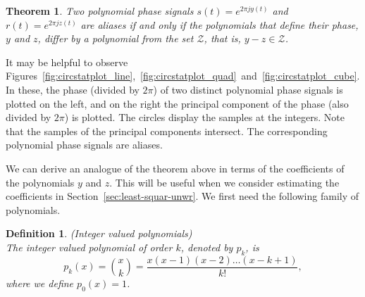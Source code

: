 \documentclass[aap]{imsart}
\newtheorem{corollary}{Corollary}
\newtheorem{theorem}{Theorem}
\newtheorem{definition}{Definition}
\begin{document}
\begin{theorem}\label{thm:circpolysampledthm}
Two polynomial phase signals $s(t) = e^{2\pi j y(t)}$  and $r(t) = e^{2\pi j z(t)}$  are aliases if and only if the polynomials that define their phase, $y$ and $z$, differ by a polynomial from the set $\mathcal{Z}$, that is, $y - z \in \mathcal{Z}$.
\end{theorem}



It may be helpful to observe Figures~\ref{fig:circstatplot_line},~\ref{fig:circstatplot_quad}~and~\ref{fig:circstatplot_cube}.  In these, the phase (divided by $2\pi$) of two distinct polynomial phase signals is plotted on the left, and on the right the principal component of the phase (also divided by $2\pi$) is plotted.  The circles display the samples at the integers. Note that the samples of the principal components intersect.  The corresponding polynomial phase signals are aliases.

We can derive an analogue of the theorem above in terms of the coefficients of the polynomials $y$ and $z$. This will be useful when we consider estimating the coefficients in Section~\ref{sec:least-squar-unwr}.  We first need the following family of polynomials. 

\begin{definition} \emph{(Integer valued polynomials)} \label{def:intvaledpolys}
\\The integer valued polynomial of order $k$, denoted by $p_k$, is
\[
p_k(x) = \binom{x}{k} = \frac{x(x-1)(x-2)\dots(x-k+1)}{k!},
\]
where we define $p_0(x) = 1$.
\end{definition}
\end{document}
